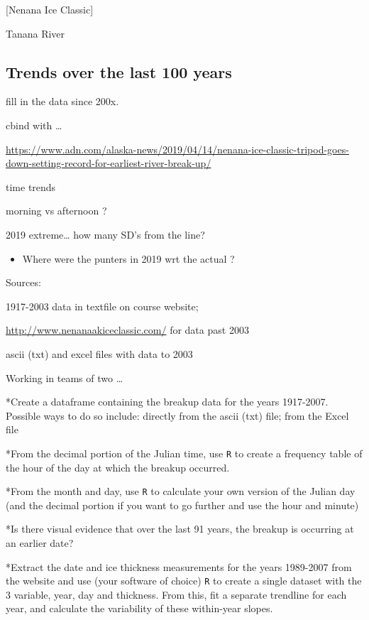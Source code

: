\documentclass[]{book}
\providecommand{\tightlist}{%
  \setlength{\itemsep}{0pt}\setlength{\parskip}{0pt}}
\begin{document}
{[}Nenana Ice Classic{]}

Tanana River

\hypertarget{trends-over-the-last-100-years}{%
\subsection{Trends over the last 100 years}\label{trends-over-the-last-100-years}}

fill in the data since 200x.

cbind with \ldots{}

\url{https://www.adn.com/alaska-news/2019/04/14/nenana-ice-classic-tripod-goes-down-setting-record-for-earliest-river-break-up/}

time trends

morning vs afternoon ?

2019 extreme\ldots{} how many SD's from the line?

\begin{itemize}
\tightlist
\item
  Where were the punters in 2019 wrt the actual ?
\end{itemize}

Sources:

1917-2003 data in textfile on course website;

\url{http://www.nenanaakiceclassic.com/} for data past 2003

ascii (txt) and excel files with data to 2003

Working in teams of two \ldots{}

*Create a dataframe containing the breakup data for the years 1917-2007. Possible ways to do so include: directly from the ascii (txt) file; from the Excel file

*From the decimal portion of the Julian time, use \texttt{R} to create a frequency table of the hour of the day at which the breakup occurred.

*From the month and day, use \texttt{R} to calculate your own version of the Julian day (and the decimal portion if you want to go further and use the hour and minute)

*Is there visual evidence that over the last 91 years, the breakup is occurring at an earlier date?

*Extract the date and ice thickness measurements for the years 1989-2007 from the website and use (your software of choice) \texttt{R} to create a single dataset with the 3 variable, year, day and thickness. From this, fit a separate trendline for each year, and calculate the variability of these within-year slopes.
\end{document}
